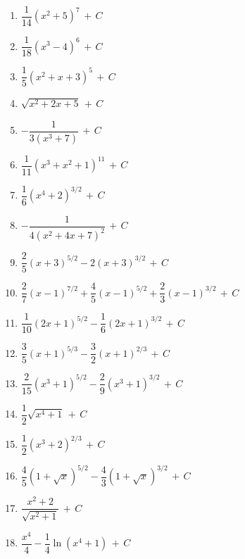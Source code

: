 \documentclass[12pt, letterpaper]{article}
\newcommand{\CC}{\,+\,C}
\begin{document}
\begin{enumerate}[label=\textbf{\arabic*.}, leftmargin=*, itemsep=5pt]

  \item $\dfrac{1}{14}(x^{2}+5)^{7} \CC$

  \item $\dfrac{1}{18}(x^{3}-4)^{6} \CC$

  \item $\dfrac{1}{5}(x^{2}+x+3)^{5} \CC$

  \item $\sqrt{x^{2}+2x+5} \CC$

  \item $-\dfrac{1}{3(x^{3}+7)} \CC$

  \item $\dfrac{1}{11}(x^{3}+x^{2}+1)^{11} \CC$

  \item $\dfrac{1}{6}(x^{4}+2)^{3/2} \CC$

  \item $-\dfrac{1}{4(x^{2}+4x+7)^{2}} \CC$

  \item $\dfrac{2}{5}(x+3)^{5/2} - 2(x+3)^{3/2} \CC$

  \item $\dfrac{2}{7}(x-1)^{7/2} + \dfrac{4}{5}(x-1)^{5/2} + \dfrac{2}{3}(x-1)^{3/2} \CC$

  \item $\dfrac{1}{10}(2x+1)^{5/2} - \dfrac{1}{6}(2x+1)^{3/2} \CC$

  \item $\dfrac{3}{5}(x+1)^{5/3} - \dfrac{3}{2}(x+1)^{2/3} \CC$

  \item $\dfrac{2}{15}(x^{3}+1)^{5/2} - \dfrac{2}{9}(x^{3}+1)^{3/2} \CC$

  \item $\dfrac{1}{2}\sqrt{x^{4}+1} \CC$

  \item $\dfrac{1}{2}(x^{3}+2)^{2/3} \CC$

  \item $\dfrac{4}{5}(1+\sqrt{x})^{5/2} - \dfrac{4}{3}(1+\sqrt{x})^{3/2} \CC$

  \item $\dfrac{x^{2}+2}{\sqrt{x^{2}+1}} \CC$

  \item $\dfrac{x^{4}}{4} - \dfrac{1}{4}\ln(x^{4}+1) \CC$


\end{enumerate}
\end{document}
